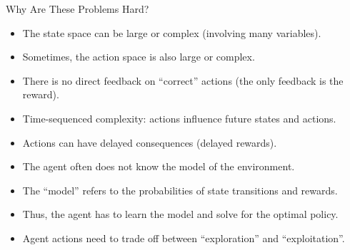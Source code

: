 \begin{frame}{Why Are These Problems Hard?}
    \begin{itemize}
        \item The state space can be large or complex (involving many variables).
        \item Sometimes, the action space is also large or complex.
        \item There is no direct feedback on “correct” actions (the only feedback is the reward).
        \item Time-sequenced complexity: actions influence future states and actions.
        \item Actions can have delayed consequences (delayed rewards).
        \item The agent often does not know the model of the environment.
        \item The “model” refers to the probabilities of state transitions and rewards.
        \item Thus, the agent has to learn the model and solve for the optimal policy.
        \item Agent actions need to trade off between “exploration” and “exploitation”.
    \end{itemize}
\end{frame}